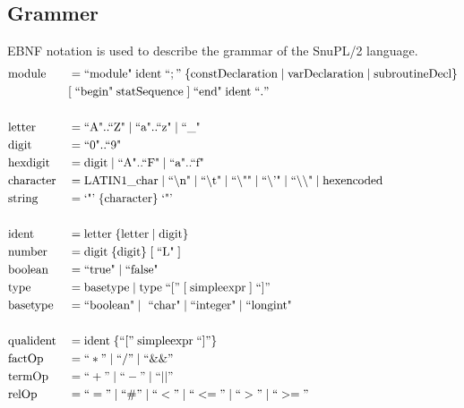\documentclass[12pt]{article}
\begin{document}
\subsection{Grammer}
\label{Appendix:Syntax}
EBNF notation is used to describe the grammar of the SnuPL/2 language.
{\allowdisplaybreaks
\begin{align*}
    &\text{module} &&= \text{``module"} \; \text{ident} \; ``;" \; \{ \text{constDeclaration} \; | \; \text{varDeclaration} \; | \; \text{subroutineDecl} \} \\
    &&&[ \; \text{``begin"} \; \text{statSequence} \; ] \; \text{``end"} \; \text{ident} \; ``." \\ \\
    &\text{letter} &&= \text{``A"..``Z"} \; | \; \text{``a"..``z"} \; | \; \text{``\_"} \\
    &\text{digit} &&= \text{``0"..``9"} \\
    &\text{hexdigit} &&= \text{digit} \; | \; \text{``A"..``F"} \; | \; \text{``a"..``f"} \\
    &\text{character} &&= \text{LATIN1\_char} \; | \; \text{``\textbackslash n"} \; | \; \text{``\textbackslash t"} \; 
    | \; \text{``\textbackslash ""} \; | \; \text{``\textbackslash '"} \; | \; \text{``\textbackslash\textbackslash"} \; | \; \text{hexencoded} \\
    &\text{string} &&= \text{`"'} \; \{ \text{character} \} \; \text{`"'} \\ \\
    &\text{ident} &&= \text{letter} \; \{ \text{letter} \; | \; \text{digit} \} \\
    &\text{number} &&= \text{digit} \; \{ \text{digit} \} \; [ \; \text{``L"} \; ] \\
    &\text{boolean} &&= \text{``true"} \; | \; \text{``false"} \\
    &\text{type} &&= \text{basetype} \; | \; \text{type} \; ``[" \; [ \; \text{simpleexpr} \; ] \; ``]" \\
    &\text{basetype} &&= \text{``boolean"} \; | \; \text{ ``char"} \; | \; \text{``integer"} \; | \; \text{``longint"} \\ \\
    &\text{qualident} &&= \text{ident} \; \{ ``[" \; \text{simpleexpr} \; ``]" \} \\
    &\text{factOp} &&= ``*" \; | \; ``/" \; | \; ``\&\&" \\
    &\text{termOp} &&= ``+" \; | \; ``-" \; | \; ``||" \\
    &\text{relOp} &&= ``=" \; | \; ``\#" \; | \; ``<" \; | \; ``<=" \; | \; ``>" \; | \; ``>=" \\ \\

\end{align*}}
\end{document}

